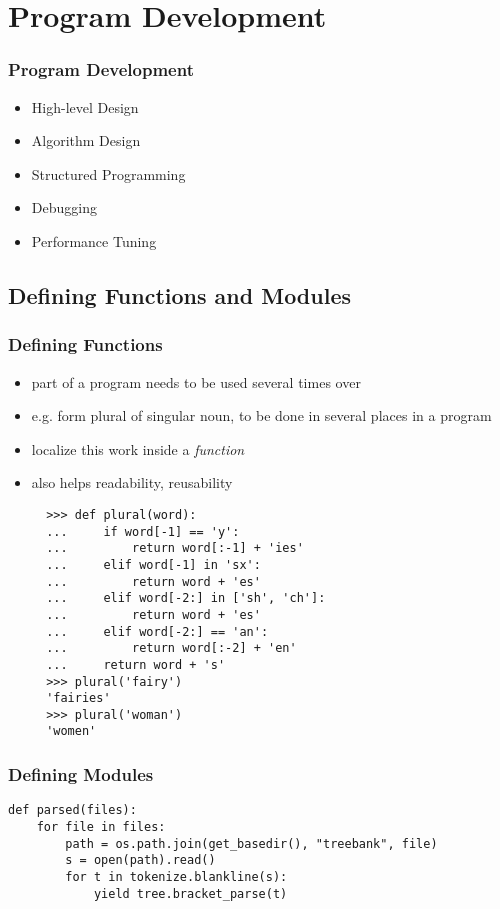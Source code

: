 \documentclass[handout]{beamer}
\begin{document}
\section{Program Development}

\begin{frame}
\frametitle{Program Development}
\begin{itemize}
\item High-level Design
\item Algorithm Design
\item Structured Programming
\item Debugging
\item Performance Tuning
\end{itemize}
\end{frame}

\subsection{Defining Functions and Modules}

\begin{frame}[fragile]
\frametitle{Defining Functions}
\scriptsize
\begin{itemize}
\item part of a program needs to be used several times over
\item e.g. form plural of singular noun, to be done in several places
  in a program
\item localize this work inside a \textit{function}
\item also helps readability, reusability

\begin{verbatim}
  >>> def plural(word):
  ...     if word[-1] == 'y':
  ...         return word[:-1] + 'ies'
  ...     elif word[-1] in 'sx':
  ...         return word + 'es'
  ...     elif word[-2:] in ['sh', 'ch']:
  ...         return word + 'es'
  ...     elif word[-2:] == 'an':
  ...         return word[:-2] + 'en'
  ...     return word + 's'
  >>> plural('fairy')
  'fairies'
  >>> plural('woman')
  'women'
\end{verbatim}
\end{itemize}
\end{frame}

\begin{frame}[fragile]
  \frametitle{Defining Modules}

\begin{verbatim}
def parsed(files):
    for file in files:
        path = os.path.join(get_basedir(), "treebank", file)
        s = open(path).read()
        for t in tokenize.blankline(s):
            yield tree.bracket_parse(t)
\end{verbatim}
\end{frame}
\end{document}
